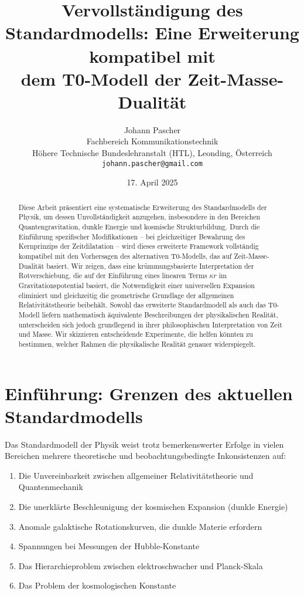 \documentclass[12pt,a4paper]{article}
\title{Vervollständigung des Standardmodells: Eine Erweiterung kompatibel mit\\dem T0-Modell der Zeit-Masse-Dualität}
\author{Johann Pascher\\
	Fachbereich Kommunikationstechnik\\
	Höhere Technische Bundeslehranstalt (HTL), Leonding, Österreich\\
	\texttt{johann.pascher@gmail.com}}
\date{17. April 2025}
\begin{document}
	
	\maketitle
	
	\begin{abstract}
		Diese Arbeit präsentiert eine systematische Erweiterung des Standardmodells der Physik, um dessen Unvollständigkeit anzugehen, insbesondere in den Bereichen Quantengravitation, dunkle Energie und kosmische Strukturbildung. Durch die Einführung spezifischer Modifikationen – bei gleichzeitiger Bewahrung des Kernprinzips der Zeitdilatation – wird dieses erweiterte Framework vollständig kompatibel mit den Vorhersagen des alternativen T0-Modells, das auf Zeit-Masse-Dualität basiert\cite{pascher_zeit_masse_2025}. Wir zeigen, dass eine krümmungsbasierte Interpretation der Rotverschiebung, die auf der Einführung eines linearen Terms $\kappa r$ im Gravitationspotential basiert, die Notwendigkeit einer universellen Expansion eliminiert und gleichzeitig die geometrische Grundlage der allgemeinen Relativitätstheorie beibehält. Sowohl das erweiterte Standardmodell als auch das T0-Modell liefern mathematisch äquivalente Beschreibungen der physikalischen Realität, unterscheiden sich jedoch grundlegend in ihrer philosophischen Interpretation von Zeit und Masse. Wir skizzieren entscheidende Experimente, die helfen könnten zu bestimmen, welcher Rahmen die physikalische Realität genauer widerspiegelt.
	\end{abstract}
	
	\tableofcontents
	\newpage
	
	\section{Einführung: Grenzen des aktuellen Standardmodells}
	\label{sec:introduction}
	
	Das Standardmodell der Physik weist trotz bemerkenswerter Erfolge in vielen Bereichen mehrere theoretische und beobachtungsbedingte Inkonsistenzen auf:
	
	\begin{enumerate}
		\item Die Unvereinbarkeit zwischen allgemeiner Relativitätstheorie\cite{einstein1915} und Quantenmechanik\cite{schrodinger1926}
		\item Die unerklärte Beschleunigung der kosmischen Expansion (dunkle Energie)\cite{perlmutter1999}
		\item Anomale galaktische Rotationskurven, die dunkle Materie erfordern\cite{rubin1980}
		\item Spannungen bei Messungen der Hubble-Konstante\cite{riess2019}
		\item Das Hierarchieproblem zwischen elektroschwacher und Planck-Skala\cite{thooft1980}
		\item Das Problem der kosmologischen Konstante\cite{weinberg1989}
	\end{enumerate}
	
\end{document}
